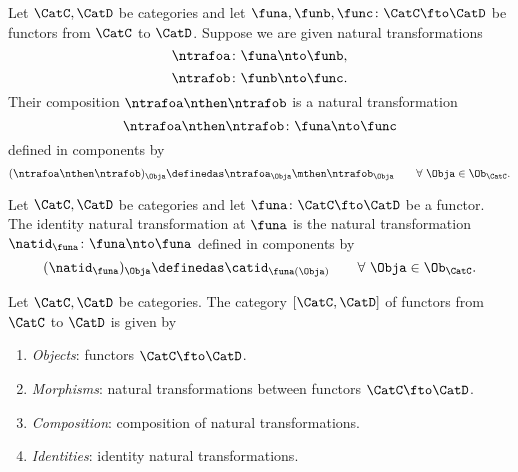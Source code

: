 \begin{ctdefinition}\label{def:composition-of-naturali-tranformations}
    Let $\CatC, \CatD$ be categories and let $\funa, \funb, \func \colon \CatC \fto \CatD$ be functors from $\CatC$ to $\CatD$.
    Suppose we are given natural transformations
    \begin{equation}
        \ntrafoa \colon \funa \nto \funb,
    \end{equation}
    \begin{equation}
        \ntrafob \colon \funb \nto \func.
    \end{equation}
    Their composition $\ntrafoa \nthen \ntrafob$ is a natural transformation
    \begin{equation}
        \ntrafoa \nthen \ntrafob \colon \funa \nto \func
    \end{equation}
    defined in components by
    \begin{equation}\label{eq:nat-trafo-composition}
        (\ntrafoa \nthen \ntrafob)_\Obja \definedas \ntrafoa_\Obja \mthen \ntrafob_\Obja \quad \quad \forall \ \Obja \in \Ob_\CatC.
    \end{equation}
\end{ctdefinition}

\begin{ctdefinition}\label{def:identity-natural-transformation}
    Let $\CatC, \CatD$ be categories and let $\funa \colon \CatC \fto \CatD$ be a functor.
    The identity natural transformation at $\funa$ is the natural transformation $\natid_\funa \colon \funa \nto \funa$ defined in components by
    \begin{equation}\label{eq:identity-nat-trafo-def}
        (\natid_\funa)_\Obja \definedas \catid_{\funa(\Obja)} \quad \quad \forall \ \Obja \in \Ob_\CatC.
    \end{equation}
\end{ctdefinition}

\begin{ctdefinition}\label{def:category-of-functors}
    Let $\CatC, \CatD$ be categories.
    The category $[\CatC, \CatD]$ of functors from $\CatC$ to $\CatD$ is given by
    \begin{enumerate}
        \item \emph{Objects}: functors $\CatC \fto \CatD$.
        \item \emph{Morphisms}: natural transformations between functors $\CatC \fto \CatD$.
        \item \emph{Composition}: composition of natural transformations.
        \item \emph{Identities}: identity natural transformations.
    \end{enumerate}
\end{ctdefinition}

